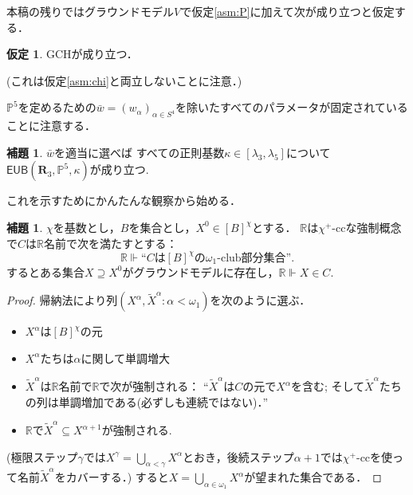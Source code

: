 \documentclass[uplatex,dvipdfmx]{jsarticle}
\newcommand\forces{\Vdash}
\newcommand{\EUB}{\mathsf{EUB}}
\newcommand{\relR}{\mathbf{R}}
\newcommand{\Pa}{\mathbb{P}^5}
\newcommand{\mR}{\mathbb{R}}
\theoremstyle{definition}
\newtheorem{lem}[thm]{補題}
\newtheorem{assumption}[thm]{仮定}
\begin{document}
	本稿の残りではグラウンドモデル$V$で仮定\ref{asm:P}に加えて次が成り立つと仮定する．
	\begin{assumption}
		GCHが成り立つ．
	\end{assumption}
	(これは仮定\ref{asm:chi}と両立しないことに注意．)
	
	$\Pa$を定めるための$\bar w=(w_\alpha)_{\alpha\in S^4}$を除いたすべてのパラメータが固定されていることに注意する．
	
	\begin{lem}\label{lem:gch-construction}
		$\bar w$を適当に選べば
		すべての正則基数$\kappa\in [\lambda_3,\lambda_5]$について$\EUB(\relR_3, \Pa,\kappa)$が成り立つ.
	\end{lem}
	
	これを示すためにかんたんな観察から始める．
	\begin{lem}\label{lem:club}
		$\chi$を基数とし，$B$を集合とし，$X^0\in [B]^\chi$とする． 
		$\mR$は$\chi^+$-ccな強制概念で$C$は$\mR$名前で次を満たすとする：
		\[
		\mR \forces \text{``$C$は$[B]^\chi$の$\omega_1$-club部分集合''}.
		\]
		するとある集合$X\supseteq X^0$がグラウンドモデルに存在し，$\mR \forces X\in C$.
	\end{lem}
	\begin{proof}
		帰納法により列$(X^\alpha, \tilde X^\alpha : \alpha < \omega_1)$を次のように選ぶ．
		\begin{itemize}
			\item $X^\alpha$は$[B]^\chi$の元
			\item $X^\alpha$たちは$\alpha$に関して単調増大
			\item $\tilde X^\alpha$は$\mR$名前で$\mR$で次が強制される： ``$\tilde X^\alpha$は$C$の元で$X^\alpha$を含む; 
		そして$\tilde X^\alpha$たちの列は単調増加である(必ずしも連続ではない)．''
			\item $\mR$で$\tilde X^\alpha\subseteq X^{\alpha+1}$が強制される.
		\end{itemize}
		(極限ステップ$\gamma$では$X^\gamma=\bigcup_{\alpha<\gamma}X^\alpha$とおき，後続ステップ$\alpha+1$では$\chi^+$-ccを使って名前$\tilde X^\alpha$をカバーする．)
		すると$X=\bigcup_{\alpha\in\omega_1}X^\alpha$が望まれた集合である．
	\end{proof}
	
\end{document}
